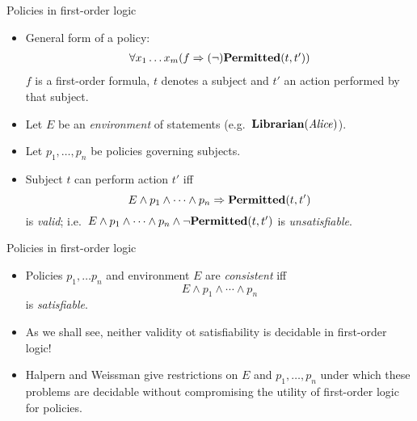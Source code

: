 \documentclass[style=sailor,size=12pt]{powerdot}
\begin{document}
\begin{wideslide}[bm=,toc=]{Policies in first-order logic}
\begin{itemize}
\item General form of a policy:
\begin{displaymath}
\begin{array}{l}
\forall x_1\ldots x_m(f \Rightarrow (\neg)\mbox{\bf Permitted}(t,t'))
\end{array}
\end{displaymath}
$f$ is a first-order formula, $t$ denotes a subject and $t'$ an action performed by that subject.
\item Let $E$ be an {\em environment\/} of statements (e.g.\ $\mbox{\bf Librarian}(\mbox{\it Alice\/})$).
\item Let $p_1,\ldots ,p_n$ be policies governing subjects.
\item Subject $t$ can perform action $t'$ iff 
\begin{displaymath}
E\wedge p_1 \wedge \cdots \wedge p_n \Rightarrow \mbox{\bf Permitted}(t,t')
\end{displaymath}
is {\em valid\/}; i.e.\ $E\wedge p_1 \wedge \cdots \wedge p_n \wedge \neg\mbox{\bf Permitted}(t,t')$ 
is {\em unsatisfiable\/}.
\end{itemize}
\end{wideslide}

\begin{wideslide}[bm=,toc=]{Policies in first-order logic}
\begin{itemize}
\item Policies $p_1,\dots p_n$ and environment $E$ are {\em consistent\/} iff
\begin{displaymath}
E\wedge p_1 \wedge \cdots \wedge p_n 
\end{displaymath}
is {\em satisfiable\/}.
\item As we shall see, neither validity ot satisfiability is decidable in first-order logic!
\item Halpern and Weissman give restrictions on $E$ and $p_1,\ldots ,p_n$ under which
these problems are decidable without compromising the utility of first-order logic for policies.
\end{itemize}
\end{wideslide}
\end{document}
